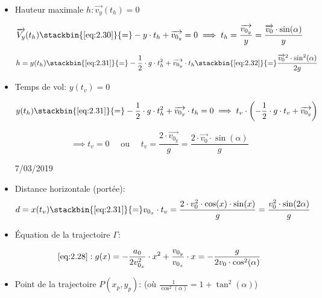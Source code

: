 \documentclass[
    11pt,
    a4paper,
    oneside,
    headinlcude, footinclude,
    twoside,
]{report}
\newcommand{\markDate}[1]{\begin{flushright}#1\end{flushright}}
\renewcommand{\vec}[1]{\overrightarrow{#1}}
\begin{document}
\begin{itemize}
\item Hauteur maximale $h: \vec{v_{y}} (t_{h}) = 0$ 

\begin{equation}
\label{eq:2.32} 
\vec{V_{y}} (t_{h}) \stackbin{\eqref{eq:2.30}}{=} - y \cdot t_{h}
+ \vec{v_{0_{y}}} = 0 \implies t_{h} = \frac{\vec{v_{0_{y}}}}{y} =
\frac{\vec{v_{0}} \cdot \sin(\alpha)}{y}
\end{equation}

\begin{equation}
\label{eq:2.33}
h = y (t_{h}) \stackbin{\eqref{eq:2.31}}{=} -\frac{1}{2} \cdot g
\cdot t_{h}^{2} + \vec{v_{0_{y}}} \cdot t_{h}
\stackbin{\eqref{eq:2.32}}{=} \frac{\vec{v_{0}}^{2} \cdot \sin^{2}(\alpha)}{2g}
\end{equation}

\pagebreak

\item Temps de vol: $y (t_{v}) = 0$ 

$$ y (t_{h}) \stackbin{\eqref{eq:2.31}}{=} -\frac{1}{2} \cdot g \cdot
t_{h}^{2} + \vec{v_{0_{y}}} \cdot t_{h} = 0 \implies t_{v} \cdot
\left(-\frac{1}{2} \cdot g \cdot t_{v} + \vec{v_{0_{y}}}\right) $$

\begin{equation}
\label{eq:2.34}
\implies t_{v} = 0 \quad \text{ ou }\quad  t_{v} = \frac{2 \cdot \vec{v_{0_{y}}}}{g}
= \frac{2 \cdot \vec{v_{0}} \cdot \sin(\alpha)}{g}
\end{equation}


\markDate{7/03/2019}

\item Distance horizontale (portée): 
\begin{equation}
\label{eq:2.35}
d = x (t_{v}) \stackbin{\eqref{eq:2.31}}{=} v_{0_{x}} \cdot
t_{v} = \frac{2 \cdot v_{0}^{2} \cdot \cos(x) \cdot \sin (x)}{g}
= \frac{v_{0}^{2} \cdot \sin (2\alpha)}{g}
\end{equation}

\item Équation de la trajectoire $\Gamma$:

\begin{equation}
\label{eq:2.36}
\eqref{eq:2.28}: g (x) = -\frac{a_{0}}{2 v_{0_{x}}^{2}} \cdot
x^{2} + \frac{v_{0_{y}}}{v_{0_{x}}} \cdot x = - \frac{g}{2 v_{0}
\cdot \cos^{2}(\alpha)}
\end{equation}

\item Point de la trajectoire $P (x_{p}, y_{p})$: (où $\frac{1}{\cos^{2}(\alpha)}
= 1 + \tan^{2}(\alpha)$)


\end{itemize}
\end{document}
